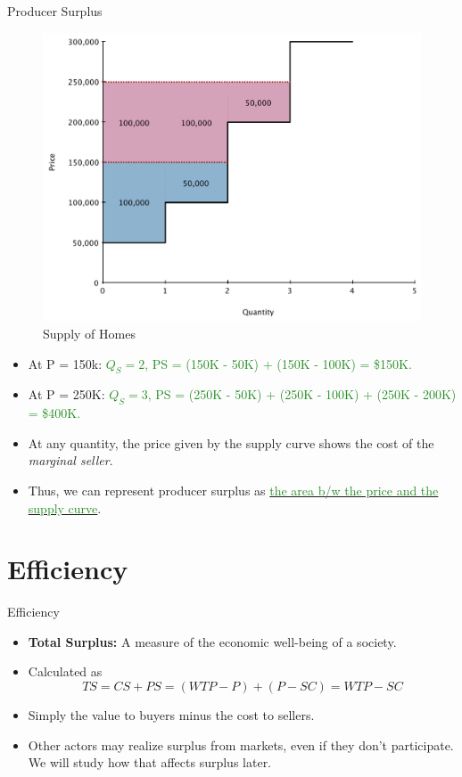\documentclass[xcolor={dvipsnames},pdf, hyperref={colorlinks=true, citecolor=ForestGreen, linkcolor=BlueViolet, urlcolor=Magenta}]{beamer}
\newcommand{\defn}[1]{\textbf{#1}}
\newcommand{\ddp}[1]{{\textcolor{ForestGreen}{#1}}}
\newcommand{\dd}[1]{{\underline{\textcolor{ForestGreen}{#1}}}}
\begin{document}
\begin{frame}[b]{Producer Surplus }
	\begin{figure}[H]
		\centering
		\includegraphics[scale=.25]{plot20.pdf}
		\caption{Supply of Homes}
	\end{figure}
\begin{itemize}
	\scriptsize
	\item At P = 150k: \ddp{$Q_S = 2$, PS = (150K - 50K) + (150K - 100K) = \$150K.} 
	\item At P = 250K: \ddp{$Q_S = 3$, PS = (250K - 50K) + (250K - 100K) + (250K - 200K) = \$400K.}
	\item At any quantity, the price given by the supply curve shows the cost of the \textit{marginal seller}. 
	\item Thus, we can represent producer surplus as \dd{the area b/w the price and the supply curve}.
\end{itemize}
\end{frame}


\section{Efficiency}

\begin{frame}{Efficiency}
	
\begin{itemize}
	\item 	\defn{Total Surplus:} A measure of the economic well-being of a society. \item Calculated as 
	\[TS = CS + PS = (WTP - P) + (P - SC) = WTP - SC\]
		\item Simply the value to buyers minus the cost to sellers.  
	
	\item Other actors may realize surplus from markets, even if they don't participate. We will study how that affects surplus later.
\end{itemize}
		
\end{frame}
\end{document}
